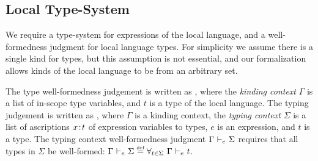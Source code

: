 \subsection{Local Type-System}
\label{sec:local-types}
We require a type-system for expressions of the local language, and a well-formedness judgment for local language types.
For simplicity we assume there is a single kind for types, but this assumption is not essential, and our formalization allows kinds of the local language to be from an arbitrary set.

The type well-formedness judgement is written as , where the \emph{kinding context} $\Gamma$ is a list of in-scope type variables, and $t$ is a type of the local language.
The typing judgement is written as , where $\Gamma$ is a kinding context, the \emph{typing context} $\Sigma$ is a list of ascriptions $x \mkern2mu{:}\mkern2mu t$ of expression variables to types, $e$ is an expression, and $t$ is a type.
The typing context well-formedness judgment $\Gamma ~{\vdash}_{\footnotesize{e}}~ \Sigma$ requires that all types in $\Sigma$ be well-formed: $\Gamma ~{\vdash}_{\footnotesize{e}}~ \Sigma \stackrel{\text{\normalfont\tiny def}}{=} \forall_{t \in \Sigma}~\Gamma ~{\vdash}_{\footnotesize{e}}~ t$.


